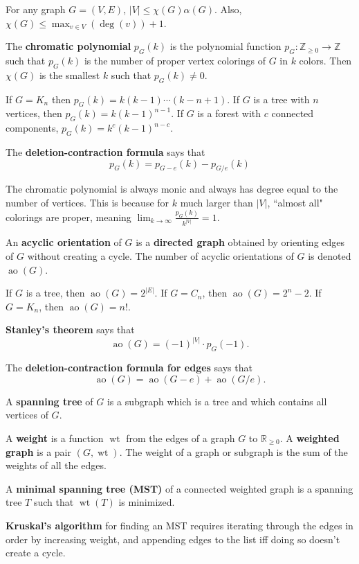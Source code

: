 \documentclass[10pt]{article}
\begin{document}
For any graph $G=(V,E)$, $|V|\leq \chi(G) \alpha(G)$. Also, $\chi(G) \leq \operatorname{max}_{v\in V}( \operatorname{deg}(v))+1$.
\par
The \textbf{chromatic polynomial} $p_G(k)$ is the polynomial function $p_G: \mathbb{Z}_{\geq 0} \rightarrow \mathbb{Z}$ such that $p_G(k)$ is the number of proper vertex colorings of $G$ in $k$ colors. Then $\chi(G)$ is the smallest $k$ such that $p_G(k) \neq 0$.
\par
If $G=K_n$ then $p_G(k)=k(k-1)\cdots(k-n+1)$. If $G$ is a tree with $n$ vertices, then $p_G(k)=k(k-1)^{n-1}$. If $G$ is a forest with $c$ connected components, $p_G(k)=k^c(k-1)^{n-c}$.
\par
The \textbf{deletion-contraction formula} says that
\[ p_G(k) = p_{G-e}(k)-p_{G/e}(k) \]
\par
The chromatic polynomial is always monic and always has degree equal to the number of vertices. This is because for $k$ much larger than $|V|$, ``almost all" colorings are proper, meaning $\lim_{k \rightarrow \infty} \frac{p_G(k)}{k^{|V|}}=1$.
\par
An \textbf{acyclic orientation} of $G$ is a \textbf{directed graph} obtained by orienting edges of $G$ without creating a cycle. The number of acyclic orientations of $G$ is denoted $ \operatorname{ao}(G)$.
\par
If $G$ is a tree, then $ \operatorname{ao}(G)=2^{|E|}$. If $G=C_n$, then $ \operatorname{ao}(G)=2^n-2$. If $G=K_n$, then $ \operatorname{ao}(G)=n!$.
\par
\textbf{Stanley's theorem} says that
\[ \operatorname{ao}(G)=(-1)^{|V|}\cdot p_G(-1). \]
\par
The \textbf{deletion-contraction formula for edges} says that
\[ \operatorname{ao}(G)= \operatorname{ao}(G-e)+ \operatorname{ao}(G/e). \]
\par
A \textbf{spanning tree} of $G$ is a subgraph which is a tree and which contains all vertices of $G$.
\par
A \textbf{weight} is a function $ \operatorname{wt}$ from the edges of a graph $G$ to $\mathbb{R}_{\geq 0}$. A \textbf{weighted graph} is a pair $(G, \operatorname{wt})$. The weight of a graph or subgraph is the sum of the weights of all the edges.
\par
A \textbf{minimal spanning tree (MST)} of a connected weighted graph is a spanning tree $T$ such that $ \operatorname{wt}(T)$ is minimized.
\par
\textbf{Kruskal's algorithm} for finding an MST requires iterating through the edges in order by increasing weight, and appending edges to the list iff doing so doesn't create a cycle.
\end{document}
